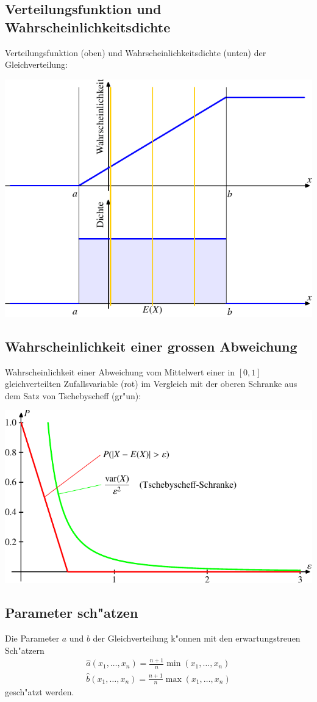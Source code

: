 \subsection{Verteilungsfunktion und Wahrscheinlichkeitsdichte}
Verteilungsfunktion (oben) und Wahrscheinlichkeitsdichte (unten)
der Gleichverteilung:
\begin{center}
\includegraphics[width=0.8\hsize]{images/verteilungsfunktion-7}
\end{center}

\subsection{Wahrscheinlichkeit einer grossen Abweichung}
Wahrscheinlichkeit einer Abweichung vom Mittelwert einer
in $[0,1]$ gleichverteilten Zufallsvariable (rot) im Vergleich mit
der oberen Schranke aus dem Satz von Tschebyscheff (gr"un):
\begin{center}
\includegraphics{images/gl-1.pdf}
\end{center}

\subsection{Parameter sch"atzen}
Die Parameter $a$ und $b$ der Gleichverteilung k"onnen mit den 
erwartungstreuen Sch"atzern
\begin{align*}
\hat a(x_1,\dots,x_n)=\frac{n+1}{n}\min(x_1,\dots,x_n)\\
\hat b(x_1,\dots,x_n)=\frac{n+1}{n}\max(x_1,\dots,x_n)
\end{align*}
gesch"atzt werden.
